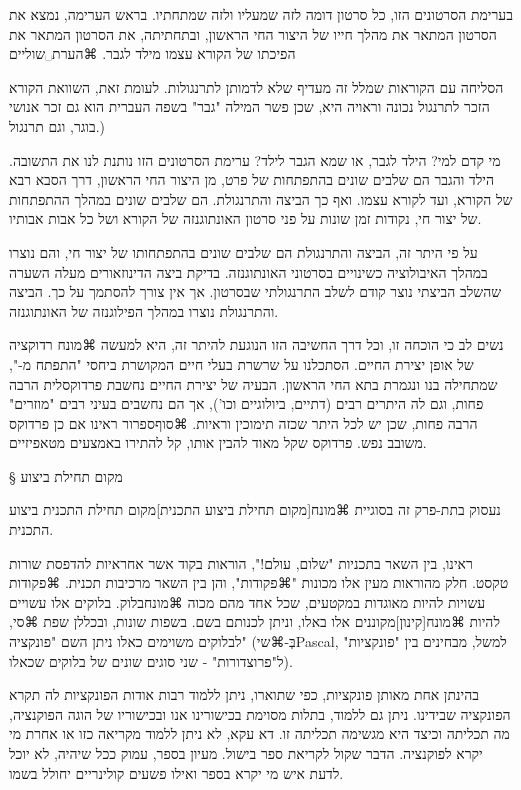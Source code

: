 בערימת הסרטונים הזו, כל סרטון דומה לזה שמעליו ולזה שמתחתיו. בראש הערימה, נמצא את הסרטון המתאר את מהלך חייו של היצור החי הראשון, ובתחתיתה, את הסרטון המתאר את הפיכתו של הקורא עצמו מילד לגבר. ⌘הערת␣שוליים{הסליחה עם הקוראות שמלל זה מעדיף שלא לדמותן לתרנגולות. לעומת זאת, השוואת הקורא הזכר לתרנגול נכונה וראויה היא, שכן  פשר המילה "גבר" בשפה העברית הוא גם זכר אנושי בוגר, וגם תרנגול.)

מי קדם למי? הילד לגבר, או שמא הגבר לילד? ערימת הסרטונים הזו נותנת לנו את התשובה. הילד והגבר הם שלבים שונים בהתפתחות של פרט, מן היצור החי הראשון, דרך הסבא רבא של הקורא, ועד לקורא עצמו. ואף כך הביצה והתרנגולת. הם שלבים שונים במהלך ההתפתחות של יצור חי, נקודות זמן שונות על פני סרטון האונתוגנזה של הקורא ושל כל אבות אבותיו. 

על פי היתר זה, הביצה והתרנגולת הם שלבים שונים בהתפתחותו של  יצור חי, והם נוצרו במהלך האיבולוציה כשינויים בסרטוני האונתוגנזה. בדיקת ביצה הדינוזאורים מעלה השערה שהשלב הביצתי נוצר קודם לשלב התרנגולתי שבסרטון. אך אין צורך להסתמך על כך. הביצה והתרנגולת נוצרו במהלך הפילוגנזה של האונתוגנזה. 


נשים לב כי הוכחה זו, וכל דרך החשיבה הזו הנוגעת להיתר זה, היא למעשה ⌘מונח {רדוקציה} של אופן יצירת החיים. הסתכלנו על שרשרת בעלי חיים המקושרת ביחסי "התפתח מ-", שמתחילה בנו ונגמרת בתא החי הראשון. הבעיה של יצירת החיים נחשבת פרדוקסלית הרבה פחות, וגם לה היתרים רבים (דתיים, ביולוגיים וכו'), אך הם נחשבים בעיני רבים "מוזרים" הרבה פחות, שכן יש לכל היתר שכזה תימוכין וראיות.
⌘סוף{ספרור}
ראינו אם כן פרדוקס משובב נפש. פרדוקס שקל מאוד להבין אותו, קל להתירו באמצעים מטאפיזיים.

§ מקום תחילת ביצוע

נעסוק בתת-פרק זה בסוגיית ⌘מונח[מקום תחילת ביצוע התכנית]{מקום תחילת התכנית} ביצוע התכנית.

ראינו, בין השאר בתכניות "שלום, עולם!", הוראות בקוד אשר אחראיות להדפסת שורות טקסט. חלק מהוראות מעין אלו מכונות "⌘פקודות", והן בין השאר מרכיבות תכנית. ⌘פקודות עשויות להיות מאוגדות במקטעים, שכל אחד מהם מכוה ⌘מונח{בלוק}. בלוקים אלו עשויים להיות ⌘מונח[קינון]{מקוננים} אלו באלו, וניתן לכנותם בשם. בשפות שונות, ובכללן שפת ⌘סי, לבלוקים משוימים כאלו ניתן השם "פונקציה" (בְּ-⌘שי{Pascal}, למשל, מבחינים בין "פונקציות" ל"פרוצדורות" - שני סוגים שונים של בלוקים שכאלו). 

בהינתן אחת מאותן פונקציות, כפי שתוארו, ניתן ללמוד רבות אודות הפונקציות לה תקרא הפונקציה שבידינו. ניתן גם ללמוד, בתלות מסוימת בכישורינו אנו ובכישוריו של הוגה הפוקנציה, מה תכליתה וכיצד היא מגשימה תכליתה זו. דא עקא, לא ניתן ללמוד מקריאה כזו או אחרת מי יקרא לפוקנציה. הדבר שקול לקריאת ספר בישול. מעיון בספר, עמוק ככל שיהיה, לא יוכל לדעת איש מי יקרא בספר ואילו פשעים קולינריים יחולל בשמו. 

}
